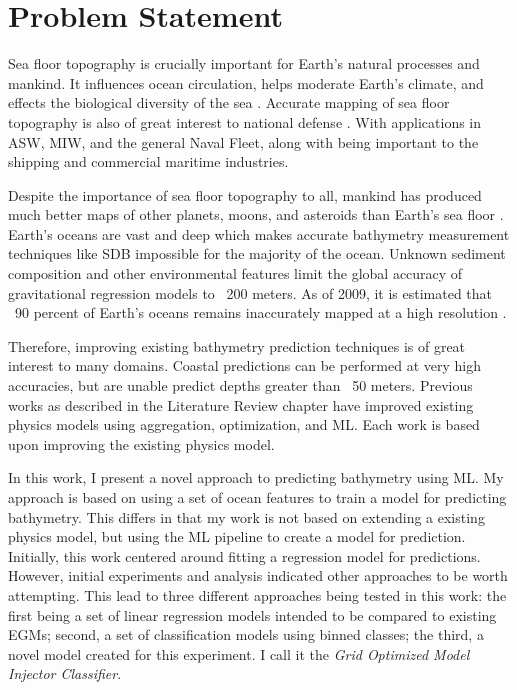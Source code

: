 \section{Problem Statement}
\setlength{\parindent}{10ex}

Sea floor topography is crucially important for Earth's natural processes and mankind.
It influences ocean circulation, helps moderate Earth's climate, and effects the biological diversity of the sea \cite{kunze2004role}.
Accurate mapping of sea floor topography is also of great interest to national defense \cite{goodman1982defence}.
With applications in \ac{ASW}, \ac{MIW}, and the general Naval Fleet, along with being important to the shipping and commercial maritime industries.

\par
Despite the importance of sea floor topography to all, mankind has produced much better maps of other planets, moons, and asteroids than Earth's sea floor \cite{becker2009global}.
Earth's oceans are vast and deep which makes accurate bathymetry measurement techniques like \ac{SDB} impossible for the majority of the ocean.
Unknown sediment composition and other environmental features limit the global accuracy of gravitational regression models to ~200 meters.
As of 2009, it is estimated that ~90 percent of Earth's oceans remains inaccurately mapped at a high resolution \cite{becker2009global}.

\par
Therefore, improving existing bathymetry prediction techniques is of great interest to many domains.
Coastal predictions can be performed at very high accuracies, but are unable predict depths greater than ~50 meters.
Previous works as described in the Literature Review chapter have improved existing physics models using aggregation, optimization, and \ac{ML}.
Each work is based upon improving the existing physics model.

\par
In this work, I present a novel approach to predicting bathymetry using \ac{ML}.
My approach is based on using a set of ocean features to train a model for predicting bathymetry.
This differs in that my work is not based on extending a existing physics model, but using the \ac{ML} pipeline to create a model for prediction.
Initially, this work centered around fitting a regression model for predictions.
However, initial experiments and analysis indicated other approaches to be worth attempting.
This lead to three different approaches being tested in this work:
the first being a set of linear regression models intended to be compared to existing \ac{EGM}s;
second, a set of classification models using binned classes;
the third, a novel model created for this experiment.
I call it the \textit{Grid Optimized Model Injector Classifier}.